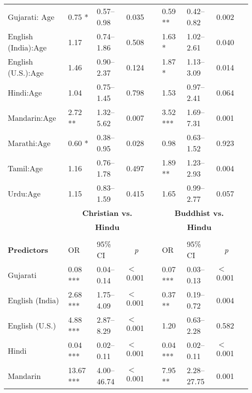 \begin{table}[ht]
\begin{threeparttable}
\begin{tabular}{lllllllll}
Gujarati: Age\tnote{b} & 0.75 * & 0.57--0.98 & 0.035 &  & 0.59 ** & 0.42--0.82 & 0.002 \\ 
English (India):Age\tnote{b} & 1.17 & 0.74--1.86 & 0.508 &  & 1.63 * & 1.02--2.61 & 0.040 \\ 
English (U.S.):Age\tnote{b} & 1.46 & 0.90--2.37 & 0.124 &  & 1.87 * & 1.13--3.09 & 0.014 \\ 
Hindi:Age\tnote{b} & 1.04 & 0.75--1.45 & 0.798 &  & 1.53 & 0.97--2.41 & 0.064 \\ 
Mandarin:Age\tnote{b} & 2.72 ** & 1.32--5.62 & 0.007 &  & 3.52 *** & 1.69--7.31 & 0.001 \\ 
Marathi:Age\tnote{b} & 0.60 * & 0.38--0.95 & 0.028 &  & 0.98 & 0.63--1.52 & 0.923 \\ 
Tamil:Age\tnote{b} & 1.16 & 0.76--1.78 & 0.497 &  & 1.89 ** & 1.23--2.93 & 0.004 \\ 
Urdu:Age\tnote{b} & 1.15 & 0.83--1.59 & 0.415 &  & 1.65 & 0.99--2.77 & 0.057 \\ 
\midrule
& \multicolumn{3}{c}{\textbf{Christian vs.}} & &
\multicolumn{3}{c}{\textbf{Buddhist vs.}}\\

& \multicolumn{3}{c}{\textbf{Hindu}\tnote{a}} & & \multicolumn{3}{c}{\textbf{Hindu}\tnote{a}}\\
\cline{2-4} \cline{6-8} \\[-.75em]
\textbf{Predictors} & OR & 95\% CI & \multicolumn{1}{c}{\textit{p}} & & OR & 95\% CI & \multicolumn{1}{c}{\textit{p}} \\ 
\midrule

Gujarati & 0.08 *** & 0.04--0.14 & $<$0.001 &  & 0.07 *** & 0.03--0.13 & $<$0.001 \\ 

English (India) & 2.68 *** & 1.75--4.09 & $<$0.001 &  & 0.37 ** & 0.19--0.72 & 0.004 \\ 

English (U.S.) & 4.88 *** & 2.87--8.29 & $<$0.001 &  & 1.20 & 0.63--2.28 & 0.582 \\

Hindi & 0.04 *** & 0.02--0.11 & $<$0.001 &  & 0.04 *** & 0.02--0.11 & $<$0.001 \\ 

Mandarin & 13.67 *** & 4.00--46.74 & $<$0.001 &  & 7.95 ** & 2.28--27.75 & 0.001 \\ 


\end{tabular}
\end{threeparttable}
\end{table}
